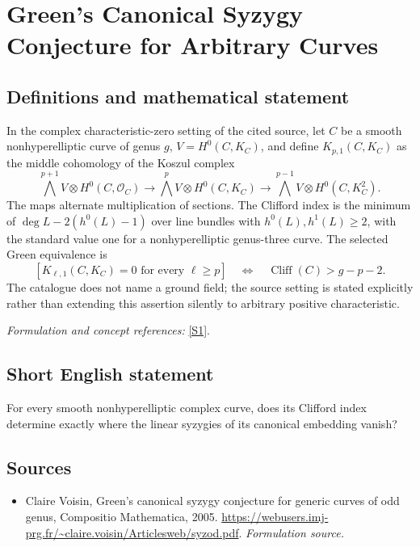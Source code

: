 \documentclass[11pt]{article}
\begin{document}
\section*{\texorpdfstring{Green’s Canonical Syzygy Conjecture for Arbitrary Curves}{Green’s Canonical Syzygy Conjecture for Arbitrary Curves}}\label{statement}
\subsection{Definitions and mathematical statement}
In the complex characteristic-zero setting of the cited source, let $C$ be a smooth nonhyperelliptic curve of genus $g$, $V=H^0(C,K_C)$, and define $K_{p,1}(C,K_C)$ as the middle cohomology of the Koszul complex
\[
 \bigwedge^{p+1}V\otimes H^0(C,\mathcal O_C)
 \longrightarrow\bigwedge^pV\otimes H^0(C,K_C)
 \longrightarrow\bigwedge^{p-1}V\otimes H^0(C,K_C^2).
\]
The maps alternate multiplication of sections. The Clifford index is the minimum of $\deg L-2(h^0(L)-1)$ over line bundles with $h^0(L),h^1(L)\ge2$, with the standard value one for a nonhyperelliptic genus-three curve. The selected Green equivalence is
\[
 [K_{\ell,1}(C,K_C)=0\text{ for every }\ell\ge p]
 \quad\Longleftrightarrow\quad\operatorname{Cliff}(C)>g-p-2.
\]
The catalogue does not name a ground field; the source setting is stated explicitly rather than extending this assertion silently to arbitrary positive characteristic.
\par\smallskip\textit{Formulation and concept references:} \href{https://webusers.imj-prg.fr/~claire.voisin/Articlesweb/syzod.pdf}{[S1]}.

\subsection{Short English statement}
For every smooth nonhyperelliptic complex curve, does its Clifford index determine exactly where the linear syzygies of its canonical embedding vanish?
\subsection{Sources}
\begin{itemize}
\item[S1]Claire Voisin, Green's canonical syzygy conjecture for generic curves of odd genus, Compositio Mathematica, 2005.
\url{https://webusers.imj-prg.fr/~claire.voisin/Articlesweb/syzod.pdf}.
\textit{Formulation source.}
\end{itemize}
\end{document}
